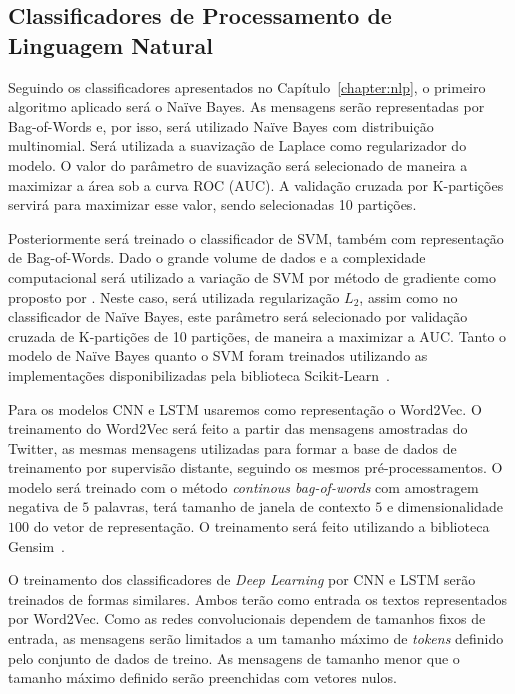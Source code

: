 \subsection{Classificadores de Processamento de Linguagem Natural}
\label{sec:nlp-classifier}

Seguindo os classificadores apresentados no Capítulo~\ref{chapter:nlp}, o
primeiro algoritmo aplicado será o Naïve Bayes.
As mensagens serão representadas por Bag-of-Words e, por isso, será utilizado
Naïve Bayes com distribuição multinomial.
Será utilizada a suavização de Laplace como regularizador do modelo.
O valor do parâmetro de suavização será selecionado de maneira a maximizar a
área sob a curva ROC (AUC).
A validação cruzada por K-partições servirá para maximizar esse valor, sendo
selecionadas 10 partições.

Posteriormente será treinado o classificador de SVM, também com representação de
Bag-of-Words.
Dado o grande volume de dados e a complexidade computacional será utilizado a
variação de SVM por método de gradiente como proposto por \citet{suykens99}.
Neste caso, será utilizada regularização $L_2$, assim como no classificador de
Naïve Bayes, este parâmetro será selecionado por validação cruzada de
K-partições de 10 partições, de maneira a maximizar a AUC.
Tanto o modelo de Naïve Bayes quanto o SVM foram treinados utilizando as
implementações disponibilizadas pela biblioteca Scikit-Learn~\cite{sklearn11}.

Para os modelos CNN e LSTM usaremos como representação o Word2Vec.
O treinamento do Word2Vec será feito a partir das mensagens amostradas do
Twitter, as mesmas mensagens utilizadas para formar a base de dados de treinamento
por supervisão distante, seguindo os mesmos pré-processamentos.
O modelo será treinado com o método \textit{continous bag-of-words} com
amostragem negativa de $5$ palavras, terá tamanho de janela de contexto $5$ e
dimensionalidade $100$ do vetor de representação.
O treinamento será feito utilizando a biblioteca Gensim~\cite{rehurek10}.

O treinamento dos classificadores de \textit{Deep Learning} por CNN e LSTM serão
treinados de formas similares.
Ambos terão como entrada os textos representados por Word2Vec.
Como as redes convolucionais dependem de tamanhos fixos de entrada, as mensagens
serão limitados a um tamanho máximo de \textit{tokens} definido pelo conjunto de
dados de treino.
As mensagens de tamanho menor que o tamanho máximo definido serão preenchidas
com vetores nulos.

